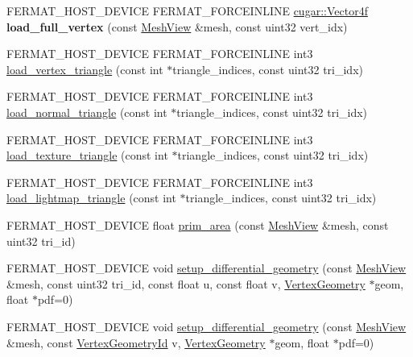 \begin{DoxyCompactItemize}
\item 
\mbox{\label{group___mesh_module_ga8c5e9b085b9f44a5ee92141bf3a90809}} 
F\+E\+R\+M\+A\+T\+\_\+\+H\+O\+S\+T\+\_\+\+D\+E\+V\+I\+CE F\+E\+R\+M\+A\+T\+\_\+\+F\+O\+R\+C\+E\+I\+N\+L\+I\+NE \hyperlink{structcugar_1_1_vector}{cugar\+::\+Vector4f} {\bfseries load\+\_\+full\+\_\+vertex} (const \hyperlink{struct_mesh_view}{Mesh\+View} \&mesh, const uint32 vert\+\_\+idx)
\item 
F\+E\+R\+M\+A\+T\+\_\+\+H\+O\+S\+T\+\_\+\+D\+E\+V\+I\+CE F\+E\+R\+M\+A\+T\+\_\+\+F\+O\+R\+C\+E\+I\+N\+L\+I\+NE int3 \hyperlink{group___mesh_module_ga50a8be2a2adb88816865cbd13a5aab57}{load\+\_\+vertex\+\_\+triangle} (const int $\ast$triangle\+\_\+indices, const uint32 tri\+\_\+idx)
\item 
F\+E\+R\+M\+A\+T\+\_\+\+H\+O\+S\+T\+\_\+\+D\+E\+V\+I\+CE F\+E\+R\+M\+A\+T\+\_\+\+F\+O\+R\+C\+E\+I\+N\+L\+I\+NE int3 \hyperlink{group___mesh_module_ga85e3684bd6c76144d9dc00a2b59cf93f}{load\+\_\+normal\+\_\+triangle} (const int $\ast$triangle\+\_\+indices, const uint32 tri\+\_\+idx)
\item 
F\+E\+R\+M\+A\+T\+\_\+\+H\+O\+S\+T\+\_\+\+D\+E\+V\+I\+CE F\+E\+R\+M\+A\+T\+\_\+\+F\+O\+R\+C\+E\+I\+N\+L\+I\+NE int3 \hyperlink{group___mesh_module_ga347e9722a85a86f87f7d31a63f333dd5}{load\+\_\+texture\+\_\+triangle} (const int $\ast$triangle\+\_\+indices, const uint32 tri\+\_\+idx)
\item 
F\+E\+R\+M\+A\+T\+\_\+\+H\+O\+S\+T\+\_\+\+D\+E\+V\+I\+CE F\+E\+R\+M\+A\+T\+\_\+\+F\+O\+R\+C\+E\+I\+N\+L\+I\+NE int3 \hyperlink{group___mesh_module_ga141eb095f266c67ca8005c9ec6f55815}{load\+\_\+lightmap\+\_\+triangle} (const int $\ast$triangle\+\_\+indices, const uint32 tri\+\_\+idx)
\item 
F\+E\+R\+M\+A\+T\+\_\+\+H\+O\+S\+T\+\_\+\+D\+E\+V\+I\+CE float \hyperlink{group___mesh_module_ga516a7610fe394a18d5083aa21f6cda75}{prim\+\_\+area} (const \hyperlink{struct_mesh_view}{Mesh\+View} \&mesh, const uint32 tri\+\_\+id)
\item 
F\+E\+R\+M\+A\+T\+\_\+\+H\+O\+S\+T\+\_\+\+D\+E\+V\+I\+CE void \hyperlink{group___mesh_module_ga4fa88a02d11b01ea12e6a602b3e3e5c2}{setup\+\_\+differential\+\_\+geometry} (const \hyperlink{struct_mesh_view}{Mesh\+View} \&mesh, const uint32 tri\+\_\+id, const float u, const float v, \hyperlink{struct_vertex_geometry}{Vertex\+Geometry} $\ast$geom, float $\ast$pdf=0)
\item 
F\+E\+R\+M\+A\+T\+\_\+\+H\+O\+S\+T\+\_\+\+D\+E\+V\+I\+CE void \hyperlink{group___mesh_module_gaf14996897cb3e5f1782571fa40736a4a}{setup\+\_\+differential\+\_\+geometry} (const \hyperlink{struct_mesh_view}{Mesh\+View} \&mesh, const \hyperlink{struct_vertex_geometry_id}{Vertex\+Geometry\+Id} v, \hyperlink{struct_vertex_geometry}{Vertex\+Geometry} $\ast$geom, float $\ast$pdf=0)

\end{DoxyCompactItemize}
